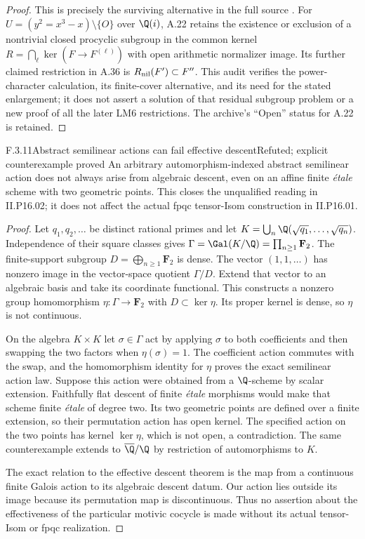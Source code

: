 \begin{proof}
This is precisely the surviving alternative in the full
source \cite[A.50, pp.33--34; A.22, pp.16--17]{AuditLM6Full2026}.
For $U=(y^2=x^3-x)\setminus\{O\}$ over $\Q(i)$, A.22
retains the existence or exclusion of a nontrivial closed
procyclic subgroup in the common kernel
$R=\bigcap_\ell\ker(F\to F^{(\ell)})$ with open arithmetic
normalizer image. Its further claimed restriction in A.36
is $R_{\rm nil}(F')\subset F''$. This audit verifies the
power-character calculation, its finite-cover alternative,
and its need for the stated enlargement; it does not assert
a solution of that residual subgroup problem or a new proof
of all the later LM6 restrictions. The archive's ``Open''
status for A.22 is retained.
\end{proof}

\begin{result}{F.3.11}{Abstract semilinear actions can fail effective descent}{Refuted; explicit counterexample proved}
An arbitrary automorphism-indexed abstract semilinear action
does not always arise from algebraic descent, even on an
affine finite \emph{\'etale} scheme with two geometric points.
This closes the unqualified reading in II.P16.02; it does
not affect the actual fpqc tensor-Isom construction in
II.P16.01.
\end{result}
\begin{proof}
Let $q_1,q_2,\ldots$ be distinct rational primes and let
$K=\bigcup_n\Q(\sqrt{q_1},\ldots,\sqrt{q_n})$.
Independence of their square classes gives
$\Gamma=\Gal(K/\Q)=\prod_{n\ge1}\mathbf F_2$.
The finite-support subgroup $D=\bigoplus_{n\ge1}\mathbf F_2$
is dense. The vector $(1,1,\ldots)$ has nonzero image in
the vector-space quotient $\Gamma/D$. Extend that vector
to an algebraic basis and take its coordinate functional.
This constructs a nonzero group homomorphism
$\eta:\Gamma\to\mathbf F_2$ with $D\subset\ker\eta$.
Its proper kernel is dense, so $\eta$ is not continuous.

On the algebra $K\times K$ let $\sigma\in\Gamma$ act by
applying $\sigma$ to both coefficients and then swapping the
two factors when $\eta(\sigma)=1$. The coefficient action
commutes with the swap, and the homomorphism identity for
$\eta$ proves the exact semilinear action law. Suppose this
action were obtained from a $\Q$-scheme by scalar extension.
Faithfully flat descent of finite \emph{\'etale} morphisms
would make that scheme finite \emph{\'etale} of degree two.
Its two geometric points are defined over a finite extension,
so their permutation action has open kernel. The specified
action on the two points has kernel $\ker\eta$, which is
not open, a contradiction. The same counterexample extends
to $\overline\Q/\Q$ by restriction of automorphisms to $K$.

The exact relation to the effective descent theorem is the
map from a continuous finite Galois action to its algebraic
descent datum. Our action lies outside its image because its
permutation map is discontinuous. Thus no assertion about
the effectiveness of the particular motivic cocycle is made
without its actual tensor-Isom or fpqc realization.
\end{proof}

